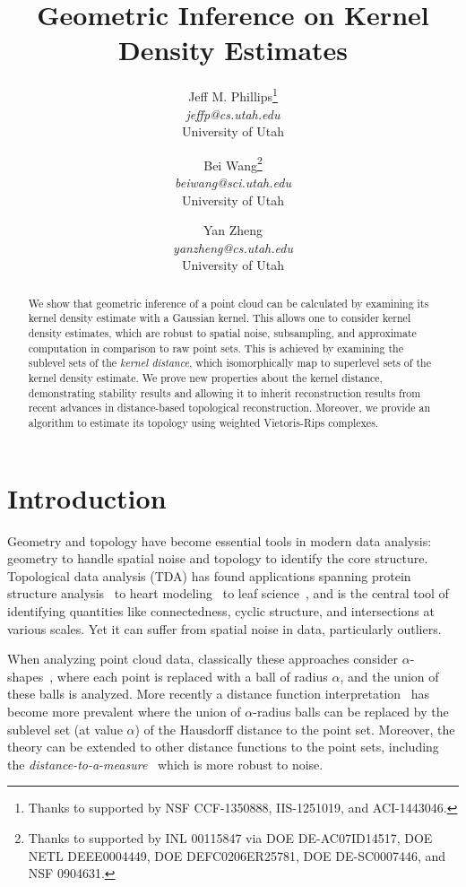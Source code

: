 \documentclass[11pt]{myclass}
\title{Geometric Inference on Kernel Density Estimates}
\author{
Jeff M. Phillips\thanks{Thanks to supported by NSF CCF-1350888, IIS-1251019, and ACI-1443046.}
     \\ {\small\textsl{jeffp@cs.utah.edu}} \\  {\small University of Utah} \and 
Bei Wang\thanks{Thanks to supported by  INL 00115847 via DOE DE-AC07ID14517, 
                                                            DOE NETL DEEE0004449, 
                                                            DOE DEFC0206ER25781, 
                                                            DOE DE-SC0007446, and
                                                            NSF 0904631.}
      \\ {\small\textsl{beiwang@sci.utah.edu}} \\  {\small University of Utah} \and
Yan Zheng \\ {\small\textsl{yanzheng@cs.utah.edu}} \\  {\small University of Utah}
}
\begin{document}
\begin{titlepage}
\maketitle 
\begin{abstract}
We show that geometric inference of a point cloud can be calculated by examining its kernel density estimate with a Gaussian kernel.  This allows one to consider kernel density estimates, which are robust to spatial noise, subsampling, and approximate computation in comparison to raw point sets.  This is achieved by examining the sublevel sets of the \emph{kernel distance}, which isomorphically map to superlevel sets of the kernel density estimate.  We prove new properties about the kernel distance, demonstrating stability results and allowing it to inherit reconstruction results from recent advances in distance-based topological reconstruction.  Moreover, we provide an algorithm to estimate its topology using weighted Vietoris-Rips complexes.
\end{abstract}
\end{titlepage}





\section{Introduction}
\label{sec:intro}

Geometry and topology have become essential tools in modern data analysis: geometry to handle spatial noise and topology to identify the core structure.  Topological data analysis (TDA) has found applications spanning protein structure analysis~\cite{EFFL95,LEFSS98} to heart modeling~\cite{GCZQMA13} to leaf science~\cite{PSMHW11}, and is the central tool of identifying quantities like connectedness, cyclic structure, and intersections at various scales.  Yet it can suffer from spatial noise in data, particularly outliers.  

When analyzing point cloud data, classically these approaches consider $\alpha$-shapes~\cite{Edelsbrunner1993}, where each point is replaced with a ball of radius $\alpha$, and the union of these balls is analyzed.  More recently a distance function interpretation~\cite{CC12} has become more prevalent where the union of $\alpha$-radius balls can be replaced by the sublevel set (at value $\alpha$) of the Hausdorff distance to the point set.  Moreover, the theory can be extended to other distance functions to the point sets, including the \emph{distance-to-a-measure}~\cite{ChazalCohen-SteinerMerigot2011} which is more robust to noise.  
\end{document}
